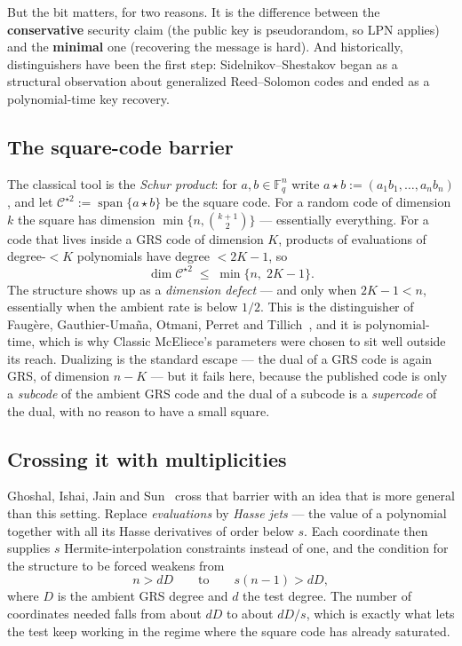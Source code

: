 But the bit matters, for two reasons. It is the difference between the \textbf{conservative} security claim (the public key is pseudorandom, so LPN applies) and the \textbf{minimal} one (recovering the message is hard). And historically, distinguishers have been the first step: Sidelnikov--Shestakov began as a structural observation about generalized Reed--Solomon codes and ended as a polynomial-time key recovery.

\subsection{The square-code barrier}

The classical tool is the \emph{Schur product}: for $a,b \in \mathbb{F}_q^n$ write $a \star b := (a_1b_1,\dots,a_nb_n)$, and let $\mathcal{C}^{\star 2} := \operatorname{span}\{a\star b\}$ be the square code. For a random code of dimension $k$ the square has dimension $\min\{n,\binom{k+1}{2}\}$ --- essentially everything. For a code that lives inside a GRS code of dimension $K$, products of evaluations of degree-$<K$ polynomials have degree $<2K-1$, so
\[
\dim \mathcal{C}^{\star 2} \;\le\; \min\{n,\; 2K-1\}.
\]
The structure shows up as a \emph{dimension defect} --- and only when $2K-1 < n$, essentially when the ambient rate is below $1/2$. This is the distinguisher of Faug\`{e}re, Gauthier-Uma\~{n}a, Otmani, Perret and Tillich~\cite{fgopt2013}, and it is polynomial-time, which is why Classic McEliece's parameters were chosen to sit well outside its reach. Dualizing is the standard escape --- the dual of a GRS code is again GRS, of dimension $n-K$ --- but it fails here, because the published code is only a \emph{subcode} of the ambient GRS code and the dual of a subcode is a \emph{supercode} of the dual, with no reason to have a small square.

\subsection{Crossing it with multiplicities}

Ghoshal, Ishai, Jain and Sun~\cite{gijs2026} cross that barrier with an idea that is more general than this setting. Replace \emph{evaluations} by \emph{Hasse jets} --- the value of a polynomial together with all its Hasse derivatives of order below $s$. Each coordinate then supplies $s$ Hermite-interpolation constraints instead of one, and the condition for the structure to be forced weakens from
\[
n > dD
\qquad\text{to}\qquad
s(n-1) > dD ,
\]
where $D$ is the ambient GRS degree and $d$ the test degree. The number of coordinates needed falls from about $dD$ to about $dD/s$, which is exactly what lets the test keep working in the regime where the square code has already saturated.

